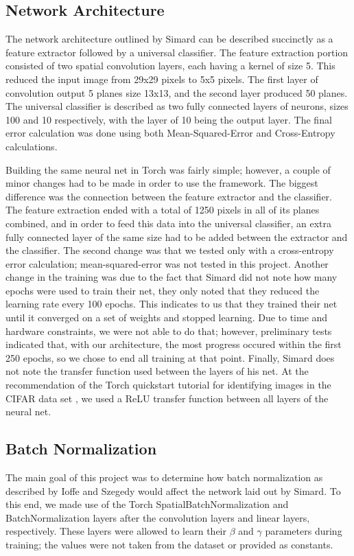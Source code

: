 \documentclass{article}
\begin{document}
\subsection{Network Architecture}
The network architecture outlined by Simard can be described succinctly as a feature extractor followed by a universal classifier. The feature extraction portion consisted of two spatial convolution layers, each having a kernel of size 5. This reduced the input image from 29x29 pixels to 5x5 pixels. The first layer of convolution output 5 planes size 13x13, and the second layer produced 50 planes. The universal classifier is described as two fully connected layers of neurons, sizes 100 and 10 respectively, with the layer of 10 being the output layer. The final error calculation was done using both Mean-Squared-Error and Cross-Entropy calculations.

Building the same neural net in Torch was fairly simple; however, a couple of minor changes had to be made in order to use the framework. The biggest difference was the connection between the feature extractor and the classifier. The feature extraction ended with a total of 1250 pixels in all of its planes combined, and in order to feed this data into the universal classifier, an extra fully connected layer of the same size had to be added between the extractor and the classifier. The second change was that we tested only with a cross-entropy error calculation; mean-squared-error was not tested in this project. Another change in the training was due to the fact that Simard did not note how many epochs were used to train their net, they only noted that they reduced the learning rate every 100 epochs. This indicates to us that they trained their net until it converged on a set of weights and stopped learning. Due to time and hardware constraints, we were not able to do that; however, preliminary tests indicated that, with our architecture, the most progress occured within the first 250 epochs, so we chose to end all training at that point. Finally, Simard does not note the transfer function used between the layers of his net. At the recommendation of the Torch quickstart tutorial \cite{torchTutorial} for identifying images in the CIFAR data set \cite{krizhevsky2009learning}, we used a ReLU transfer function between all layers of the neural net.

\subsection{Batch Normalization}
The main goal of this project was to determine how batch normalization as described by Ioffe and Szegedy would affect the network laid out by Simard. To this end, we made use of the Torch SpatialBatchNormalization and BatchNormalization layers after the convolution layers and linear layers, respectively. These layers were allowed to learn their $\beta$ and $\gamma$ parameters during training; the values were not taken from the dataset or provided as constants.
\end{document}
